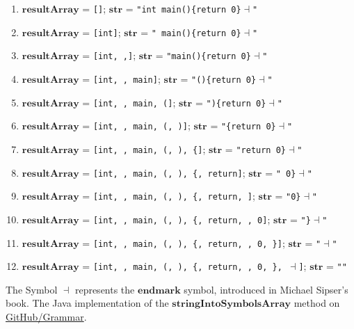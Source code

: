 \begin{enumerate}
    \item \(\boldsymbol{resultArray}\) = \texttt{[]}; \hfill \(\boldsymbol{str}\) = \texttt{"int main()\{return 0\}\( \dashv \)"}
    \item \(\boldsymbol{resultArray}\) = \texttt{[int]}; \hfill \(\boldsymbol{str}\) = \texttt{" main()\{return 0\}\( \dashv \)"}
    \item \(\boldsymbol{resultArray}\) = \texttt{[int,  ,]}; \hfill \(\boldsymbol{str}\) = \texttt{"main()\{return 0\}\( \dashv \)"}
    \item \(\boldsymbol{resultArray}\) = \texttt{[int,  , main]}; \hfill \(\boldsymbol{str}\) = \texttt{"()\{return 0\}\( \dashv \)"}
    \item \(\boldsymbol{resultArray}\) = \texttt{[int,  , main, (]}; \hfill \(\boldsymbol{str}\) = \texttt{")\{return 0\}\( \dashv \)"}
    \item \(\boldsymbol{resultArray}\) = \texttt{[int,  , main, (, )]}; \hfill \(\boldsymbol{str}\) = \texttt{"\{return 0\}\( \dashv \)"}
    \item \(\boldsymbol{resultArray}\) = \texttt{[int,  , main, (, ), \{]}; \hfill \(\boldsymbol{str}\) = \texttt{"return 0\}\( \dashv \)"}
    \item \(\boldsymbol{resultArray}\) = \texttt{[int,  , main, (, ), \{, return]}; \hfill \(\boldsymbol{str}\) = \texttt{" 0\}\( \dashv \)"}
    \item \(\boldsymbol{resultArray}\) = \texttt{[int,  , main, (, ), \{, return,  ]}; \hfill \(\boldsymbol{str}\) = \texttt{"0\}\( \dashv \)"}
    \item \(\boldsymbol{resultArray}\) = \texttt{[int,  , main, (, ), \{, return,  , 0]}; \hfill \(\boldsymbol{str}\) = \texttt{"\}\( \dashv \)"}
    \item \(\boldsymbol{resultArray}\) = \texttt{[int,  , main, (, ), \{, return,  , 0, \}]}; \hfill \(\boldsymbol{str}\) = \texttt{"\( \dashv \)"}
    \item \(\boldsymbol{resultArray}\) = \texttt{[int,  , main, (, ), \{, return,  , 0, \}, \( \dashv \)]}; \hfill \(\boldsymbol{str}\) = \texttt{""}
\end{enumerate}

The Symbol \( \dashv \) represents the \(\boldsymbol{endmark}\) symbol, introduced in Michael Sipser's book. The Java implementation of the \(\boldsymbol{stringIntoSymbolsArray}\) method on \href{https://github.com/fyfsb/dcfg/blob/main/src/main/java/grammar/Grammar.java}{GitHub/Grammar}.

